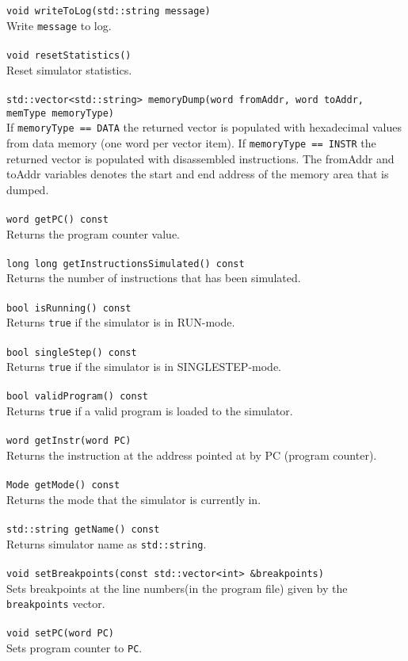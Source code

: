 {\\ \\
\texttt{void writeToLog(std::string message)}
\\ \small{Write \texttt{message} to log.}
\\ \\
\texttt{void resetStatistics()}
\\ \small{Reset simulator statistics.}
\\ \\
\texttt{std::vector<std::string> memoryDump(word fromAddr, word toAddr, memType memoryType)} 
\\ \small{If \texttt{memoryType == DATA} the returned vector is populated with hexadecimal values from data memory (one word per vector item). If \texttt{memoryType == INSTR} the returned vector is populated with disassembled instructions. The fromAddr and toAddr variables denotes the start and end address of the memory area that is dumped.}  
\\ \\
\texttt{word getPC() const}
\\ \small{Returns the program counter value.}
\\ \\
\texttt{long long getInstructionsSimulated() const}
\\ \small{Returns the number of instructions that has been simulated.}
\\ \\
\texttt{bool isRunning() const}
\\ \small{Returns \texttt{true} if the simulator is in RUN-mode.}
\\ \\
\texttt{bool singleStep() const}
\\ \small{Returns \texttt{true} if the simulator is in SINGLESTEP-mode.}
\\ \\
\texttt{bool validProgram() const}
\\ \small{Returns \texttt{true} if a valid program is loaded to the simulator.}
\\ \\
\texttt{word getInstr(word PC)}
\\ \small{Returns the instruction at the address pointed at by PC (program counter).}
\\ \\
\texttt{Mode getMode() const}
\\ \small{Returns the mode that the simulator is currently in.}
\\ \\
\texttt{std::string getName() const}
\\ \small{Returns simulator name as \texttt{std::string}.}
\\ \\
\texttt{void setBreakpoints(const std::vector<int> &breakpoints)}
\\ \small{Sets breakpoints at the line numbers(in the program file) given by the \texttt{breakpoints} vector.}
\\ \\
\texttt{void setPC(word PC)}
\\ \small{Sets program counter to \texttt{PC}.}
}